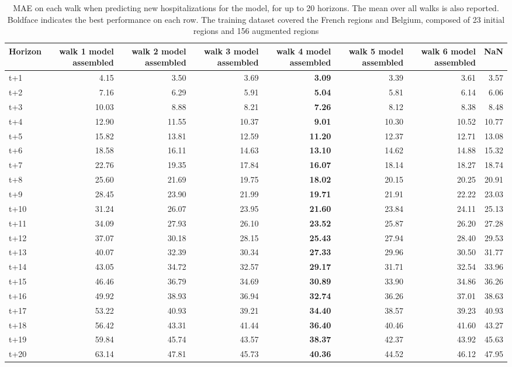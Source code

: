 \begin{table}[H]
\centering
\caption{MAE on each walk when predicting new hospitalizations for the model, for up to 20 horizons. The mean over all walks is also reported. Boldface indicates the best performance on each row. The training dataset covered the French regions and Belgium, composed of 23 initial regions and 156 augmented regions }
\label{tab:MAE_walk_assembly}
\begin{tabular}{lrrrrrrr}
\toprule
Horizon &  walk 1 model assembled &  walk 2 model assembled &  walk 3 model assembled &  walk 4 model assembled &  walk 5 model assembled &  walk 6 model assembled &   NaN \\
\midrule
t+1  & 4.15  & 3.50  & 3.69  & \textbf{3.09}  & 3.39  & 3.61  & 3.57  \\
t+2  & 7.16  & 6.29  & 5.91  & \textbf{5.04}  & 5.81  & 6.14  & 6.06  \\
t+3  & 10.03  & 8.88  & 8.21  & \textbf{7.26}  & 8.12  & 8.38  & 8.48  \\
t+4  & 12.90  & 11.55  & 10.37  & \textbf{9.01}  & 10.30  & 10.52  & 10.77  \\
t+5  & 15.82  & 13.81  & 12.59  & \textbf{11.20}  & 12.37  & 12.71  & 13.08  \\
t+6  & 18.58  & 16.11  & 14.63  & \textbf{13.10}  & 14.62  & 14.88  & 15.32  \\
t+7  & 22.76  & 19.35  & 17.84  & \textbf{16.07}  & 18.14  & 18.27  & 18.74  \\
t+8  & 25.60  & 21.69  & 19.75  & \textbf{18.02}  & 20.15  & 20.25  & 20.91  \\
t+9  & 28.45  & 23.90  & 21.99  & \textbf{19.71}  & 21.91  & 22.22  & 23.03  \\
t+10  & 31.24  & 26.07  & 23.95  & \textbf{21.60}  & 23.84  & 24.11  & 25.13  \\
t+11  & 34.09  & 27.93  & 26.10  & \textbf{23.52}  & 25.87  & 26.20  & 27.28  \\
t+12  & 37.07  & 30.18  & 28.15  & \textbf{25.43}  & 27.94  & 28.40  & 29.53  \\
t+13  & 40.07  & 32.39  & 30.34  & \textbf{27.33}  & 29.96  & 30.50  & 31.77  \\
t+14  & 43.05  & 34.72  & 32.57  & \textbf{29.17}  & 31.71  & 32.54  & 33.96  \\
t+15  & 46.46  & 36.79  & 34.69  & \textbf{30.89}  & 33.90  & 34.86  & 36.26  \\
t+16  & 49.92  & 38.93  & 36.94  & \textbf{32.74}  & 36.26  & 37.01  & 38.63  \\
t+17  & 53.22  & 40.93  & 39.21  & \textbf{34.40}  & 38.57  & 39.23  & 40.93  \\
t+18  & 56.42  & 43.31  & 41.44  & \textbf{36.40}  & 40.46  & 41.60  & 43.27  \\
t+19  & 59.84  & 45.74  & 43.57  & \textbf{38.37}  & 42.37  & 43.92  & 45.63  \\
t+20  & 63.14  & 47.81  & 45.73  & \textbf{40.36}  & 44.52  & 46.12  & 47.95  \\

\bottomrule
\end{tabular}
\end{table}
